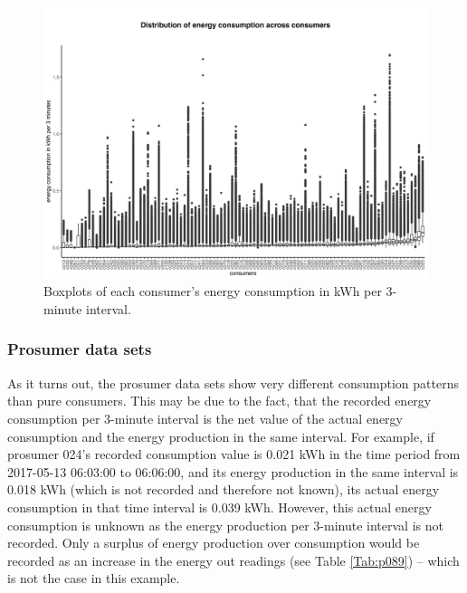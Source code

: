 \begin{figure}[htbp]
 \centering
\includegraphics[width=\textwidth]{thesis/graphs/consumer_boxplots_consumption.jpg}
\caption[Boxplots of each consumer's energy consumption in kWh per 3-minute interval]{Boxplots of each consumer's energy consumption in kWh per 3-minute interval. \quantnet}
\label{Fig:cons_boxplots_consumption}
\end{figure}

\subsubsection{Prosumer data sets}

As it turns out, the prosumer data sets show very different consumption patterns than pure consumers. This may be due to the fact, that the recorded energy consumption per 3-minute interval is the net value of the actual energy consumption and the energy production in the same interval. For example, if prosumer 024's recorded consumption value is 0.021 kWh in the time period from 2017-05-13 06:03:00 to 06:06:00, and its energy production in the same interval is 0.018 kWh (which is not recorded and therefore not known), its actual energy consumption in that time interval is 0.039 kWh. However, this actual energy consumption is unknown as the energy production per 3-minute interval is not recorded. Only a surplus of energy production over consumption would be recorded as an increase in the energy out readings (see Table \ref{Tab:p089}) -- which is not the case in this example.

